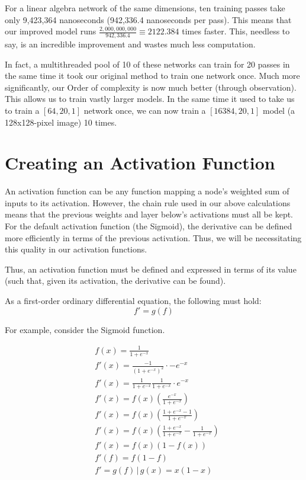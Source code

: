 \documentclass[8pt]{amsart}
\newcommand\where{\, \bigg \rvert \,}
\begin{document}
For a linear algebra network of the same dimensions, ten training passes take only
9,423,364 nanoseconds (942,336.4 nanoseconds per pass). This means that our improved
model runs $\frac{2,000,000,000}{942,336.4} \equiv 2122.384$ times faster. This, needless
to say, is an incredible improvement and wastes much less computation.

In fact, a multithreaded pool of 10 of these networks can train for 20 passes in the
same time it took our original method to train one network once. Much more significantly,
our Order of complexity is now much better (through observation). This allows us to
train vastly larger models. In the same time it used to take us to train a $[64, 20, 1]$
network once, we can now train a $[16384, 20, 1]$ model (a 128x128-pixel image) 10 times.

\section{Creating an Activation Function}

An activation function can be any function mapping
a node's weighted sum of inputs to its activation. However, the chain rule used
in our above calculations means that the previous weights and layer below's activations
must all be kept. For the default activation function (the Sigmoid), the derivative can
be defined more efficiently in terms of the previous activation. Thus, we will be
necessitating this quality in our activation functions.

Thus, an activation function must be defined and expressed in terms of its value (such
that, given its activation, the derivative can be found).

As a first-order ordinary differential equation, the following must hold:
\[
    f' = g(f)
\]

For example, consider the Sigmoid function.

\[
    \begin{aligned}
        & f(x) = \frac{1}{1 + e^{-x}} \\
        & f'(x) = \frac{-1}{(1 + e^{-x})^2} \cdot -e^{-x} \\
        & f'(x) = \frac{1}{1 + e^{-x}} \frac{1}{1 + e^{-x}} \cdot e^{-x} \\
        & f'(x) = f(x) \left( \frac{e^{-x}}{1 + e^{-x}} \right) \\
        & f'(x) = f(x) \left( \frac{1 + e^{-x} - 1}{1 + e^{-x}} \right) \\
        & f'(x) = f(x) \left( \frac{1 + e^{-x}}{1 + e^{-x}} - \frac{1}{1 + e^{-x}} \right) \\
        & f'(x) = f(x) (1 - f(x)) \\
        & f'(f) = f (1 - f) \\
        & f' = g(f) \where g(x) = x (1 - x) \\
    \end{aligned}
\]
\end{document}
